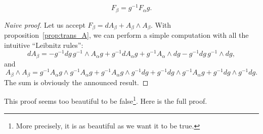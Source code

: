 \begin{theorem}
\begin{equation}
     F_{\beta}=g^{-1} F_{\alpha} g.
\end{equation}
\label{tho:trans_F}
\end{theorem}

\begin{proof}[Naive proof]
Let us accept $F_{\beta}=dA_{\beta}+A_{\beta}\wedge A_{\beta}$. With proposition~\ref{prop:trans_A}, we can perform a simple computation with all the intuitive ``Leibnitz rules'':
\[
   dA_{\beta}=-g^{-1} dg\, g^{-1}\wedge A_{\alpha} g+g^{-1} dA_{\alpha} g+g^{-1} A_{\alpha}\wedge dg-g^{-1} dg\,g^{-1}\wedge dg,
\]
and
\[
  A_{\beta}\wedge A_{\beta}=g^{-1} A_{\alpha} g\wedge g^{-1} A_{\alpha} g+g^{-1} A_{\alpha} g\wedge g^{-1} dg+g^{-1} dg\wedge g^{-1} A_{\alpha} g+g^{-1} dg\wedge g^{-1} dg.
\]
The sum is obviously the announced result.
\end{proof}
This proof seems too beautiful to be false\footnote{More precisely, it is as beautiful as we want it to be true.}. Here is the full proof.


